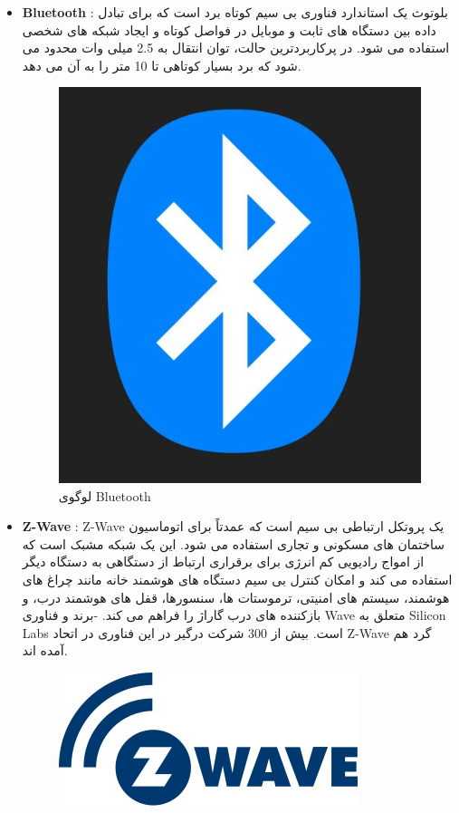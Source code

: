\begin{itemize}

    \item 
    {
        \textbf{Bluetooth} :
        بلوتوث یک استاندارد فناوری بی سیم کوتاه برد است که برای تبادل داده بین دستگاه های ثابت و موبایل در فواصل کوتاه و ایجاد شبکه های شخصی استفاده می شود. در پرکاربردترین حالت، توان انتقال به 2.5 میلی وات محدود می شود که برد بسیار کوتاهی تا 10 متر را به آن می دهد.
        \begin{figure}[H]
            \centering
            \includegraphics[width=0.55\linewidth]{images/Bluetooth.jpg}
            \caption{ لوگوی Bluetooth }
            \label{fig:h}
        \end{figure}
    }
    \item 
    {
        \textbf{Z-Wave} :
        Z-Wave یک پروتکل ارتباطی بی سیم است که عمدتاً برای اتوماسیون ساختمان های مسکونی و تجاری استفاده می شود. این یک شبکه مشبک است که از امواج رادیویی کم انرژی برای برقراری ارتباط از دستگاهی به دستگاه دیگر استفاده می کند و امکان کنترل بی سیم دستگاه های هوشمند خانه مانند چراغ های هوشمند، سیستم های امنیتی، ترموستات ها، سنسورها، قفل های هوشمند درب، و بازکننده های درب گاراژ را فراهم می کند. -برند و فناوری Wave متعلق به Silicon Labs است. بیش از 300 شرکت درگیر در این فناوری در اتحاد Z-Wave گرد هم آمده اند.
        \begin{figure}[H]
            \centering
            \includegraphics[width=0.55\linewidth]{images/ZWave.svg.png}

\end{figure}}
\end{itemize}
